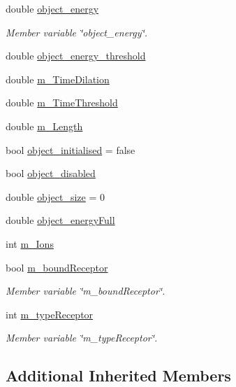 \begin{DoxyCompactItemize}
double \mbox{\hyperlink{classMembraneChannel_a3615bab719d4a6c43a1d5d3e64d0079c}{object\+\_\+energy}}
\begin{DoxyCompactList}\small\item\em Member variable \char`\"{}object\+\_\+energy\char`\"{}. \end{DoxyCompactList}\item 
double \mbox{\hyperlink{classMembraneChannel_acb697781909d7e8bd2e69fbb1268b2f2}{object\+\_\+energy\+\_\+threshold}}
\item 
double \mbox{\hyperlink{classMembraneChannel_a1c843660b2ea25ca2506f967dbd7e0d2}{m\+\_\+\+Time\+Dilation}}
\item 
double \mbox{\hyperlink{classMembraneChannel_a71a07468f3add9783acfbe2ca0df2101}{m\+\_\+\+Time\+Threshold}}
\item 
double \mbox{\hyperlink{classMembraneChannel_aa3bd560d7c7c6c5b452d11f18bca30b1}{m\+\_\+\+Length}}
\item 
bool \mbox{\hyperlink{classMembraneChannel_a9cd227ac36102ed8958973ae46163e1c}{object\+\_\+initialised}} = false
\item 
bool \mbox{\hyperlink{classMembraneChannel_acd2bbf349255bbeb5ee2304f05e14ff6}{object\+\_\+disabled}}
\item 
double \mbox{\hyperlink{classMembraneChannel_abc68fa8d4693c6512c15a230b9bc8744}{object\+\_\+size}} = 0
\item 
double \mbox{\hyperlink{classMembraneChannel_a41896472da1942a6be07eb8d6e8e508f}{object\+\_\+energy\+Full}}
\item 
int \mbox{\hyperlink{classMembraneChannel_afe6cbd4b6eeca252fde5c1b3b23f4717}{m\+\_\+\+Ions}}
\item 
bool \mbox{\hyperlink{classMembraneChannel_ab257b77285836ce5dc0c16824116351b}{m\+\_\+bound\+Receptor}}
\begin{DoxyCompactList}\small\item\em Member variable \char`\"{}m\+\_\+bound\+Receptor\char`\"{}. \end{DoxyCompactList}\item 
int \mbox{\hyperlink{classMembraneChannel_a21f2bf86c93a07d133d01927af48d96d}{m\+\_\+type\+Receptor}}
\begin{DoxyCompactList}\small\item\em Member variable \char`\"{}m\+\_\+type\+Receptor\char`\"{}. \end{DoxyCompactList}\end{DoxyCompactItemize}
\subsection*{Additional Inherited Members}


